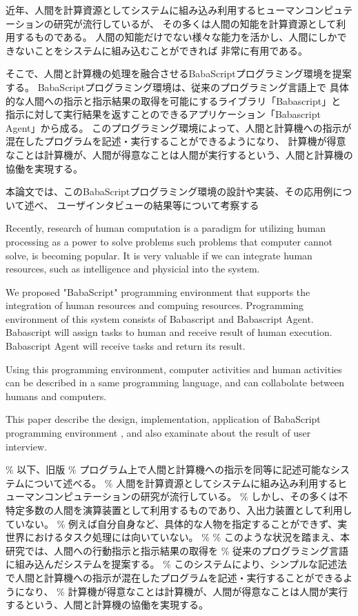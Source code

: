 \begin{jabstract}

近年、人間を計算資源としてシステムに組み込み利用するヒューマンコンピュテーションの研究が流行しているが、
その多くは人間の知能を計算資源として利用するものである。
人間の知能だけでない様々な能力を活かし、人間にしかできないことをシステムに組み込むことができれば
非常に有用である。

そこで、人間と計算機の処理を融合させるBabaScriptプログラミング環境を提案する。
BabaScriptプログラミング環境は、従来のプログラミング言語上で
具体的な人間への指示と指示結果の取得を可能にするライブラリ「Babascript」と
指示に対して実行結果を返すことのできるアプリケーション「Babascript Agent」から成る。
このプログラミング環境によって、人間と計算機への指示が混在したプログラムを記述・実行することができるようになり、
計算機が得意なことは計算機が、人間が得意なことは人間が実行するという、人間と計算機の協働を実現する。

本論文では、このBabaScriptプログラミング環境の設計や実装、その応用例について述べ、
ユーザインタビューの結果等について考察する

\end{jabstract}

\begin{eabstract}
Recently, research of human computation is a paradigm for utilizing human processing as a power to solve problems such problems that computer cannot solve, is becoming popular.
It is very valuable if we can integrate human resources, such as intelligence and physicial into the system.

We proposed "BabaScript" programming environment that supports the integration of human resources and compuing resources.
Programming environment of this system consists of Babascript and Babascript Agent.
Babascript will assign tasks to human and receive result of human execution.
Babascript Agent will receive tasks and return its result.

Using this programming environment, computer activities and human activities can be described
in a same programming language, and can collabolate between humans and computers.

This paper describe the design, implementation, application of BabaScript programming environment
, and also examinate about the result of user interview.

\end{eabstract}

\% 以下、旧版 \%
プログラム上で人間と計算機への指示を同等に記述可能なシステムについて述べる。
\%
人間を計算資源としてシステムに組み込み利用するヒューマンコンピュテーションの研究が流行している。
\%
しかし、その多くは不特定多数の人間を演算装置として利用するものであり、入出力装置として利用していない。
\%
例えば自分自身など、具体的な人物を指定することができず、実世界におけるタスク処理には向いていない。
\% \%
このような状況を踏まえ、本研究では、人間への行動指示と指示結果の取得を
\% 従来のプログラミング言語に組み込んだシステムを提案する。 \%
このシステムにより、シンプルな記述法で人間と計算機への指示が混在したプログラムを記述・実行することができるようになり、
\%
計算機が得意なことは計算機が、人間が得意なことは人間が実行するという、人間と計算機の協働を実現する。
